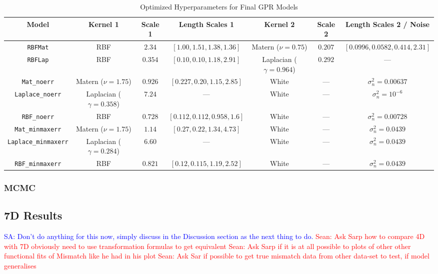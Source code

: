 \documentclass[12pt]{article}
\newcommand{\Sarp}[1]{{\textcolor{blue}{{SA: #1}} }}
\newcommand{\Sean}[1]{{\textcolor{red}{{Sean: #1}} }}
\begin{document}
\begin{table}[H]
\centering
\caption{Optimized Hyperparameters for Final GPR Models}
\footnotesize  %
\renewcommand{\arraystretch}{1.15}  %
\setlength{\tabcolsep}{4pt}  %
\label{tab:final_gpr_hyperparams}
{\fontsize{7}{9.5}\selectfont
\begin{tabular}{|c|c|c|c|c|c|c|}
\hline
\textbf{Model} & \textbf{Kernel 1} & \textbf{Scale 1} & \textbf{Length Scales 1} & \textbf{Kernel 2} & \textbf{Scale 2} & \textbf{Length Scales 2 / Noise} \\
\hline
\texttt{RBFMat} & RBF & $2.34$ & $[1.00, 1.51, 1.38, 1.36]$ & Matern ($\nu = 0.75$) & $0.207$ & $[0.0996, 0.0582, 0.414, 2.31]$ \\
\texttt{RBFLap} & RBF & $0.354$ & $[0.10, 0.10, 1.18, 2.91]$ & Laplacian ($\gamma = 0.964$) & $0.292$ & --- \\
\texttt{Mat\_noerr} & Matern ($\nu = 1.75$) & $0.926$ & $[0.227, 0.20, 1.15, 2.85]$ & White & --- & $\sigma_n^2 = 0.00637$ \\
\texttt{Laplace\_noerr} & Laplacian ($\gamma = 0.358$) & $7.24$ & --- & White & --- & $\sigma_n^2 = 10^{-6}$ \\
\texttt{RBF\_noerr} & RBF & $0.728$ & $[0.112, 0.112, 0.958, 1.6]$ & White & --- & $\sigma_n^2 = 0.00728$ \\
\texttt{Mat\_minmaxerr} & Matern ($\nu = 1.75$) & $1.14$ & $[0.27, 0.22, 1.34, 4.73]$ & White & --- & $\sigma_n^2 = 0.0439$ \\
\texttt{Laplace\_minmaxerr} & Laplacian ($\gamma = 0.284$) & $6.60$ & --- & White & --- & $\sigma_n^2 = 0.0439$ \\
\texttt{RBF\_minmaxerr} & RBF & $0.821$ & $[0.12, 0.115, 1.19, 2.52]$ & White & --- & $\sigma_n^2 = 0.0439$ \\
\hline
\end{tabular}}
\end{table}


\subsubsection*{MCMC}

\subsection{7D Results}
\Sarp{Don't do anything for this now, simply discuss in the Discussion section as the next thing to do.}
\Sean{Ask Sarp how to compare 4D with 7D obviously need to use transformation formulas to get equivalent}
\Sean{Ask Sarp if it is at all possible to plots of other other functional fits of Mismatch like he had in his plot}
\Sean{Ask Sar if possible to get true mismatch data from other data-set to test, if model generalises}
\end{document}
